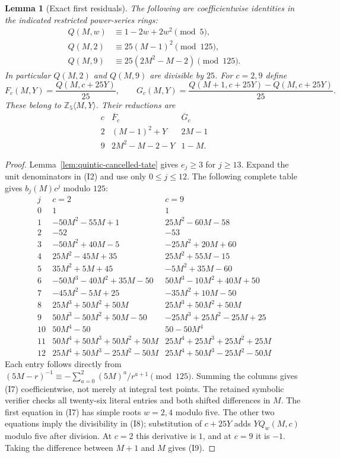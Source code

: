 \documentclass[11pt]{article}
\newtheorem{lemma}{Lemma}
\newcommand{\ZZ}{\mathbb Z}
\begin{document}
\begin{lemma}[Exact first residuals]\label{lem:quintic-index-residuals}
The following are coefficientwise identities in the indicated
restricted power-series rings:
\[
 \begin{split}
 Q(M,w)&\equiv1-2w+2w^2\pmod5,\\
 Q(M,2)&\equiv25(M-1)^2\pmod{125},\\
 Q(M,9)&\equiv25(2M^2-M-2)\pmod{125}.
 \end{split}\tag{I7}
\]
In particular $Q(M,2)$ and $Q(M,9)$ are divisible by $25$.
For $c=2,9$ define
\[
 F_c(M,Y)=\frac{Q(M,c+25Y)}{25},\qquad
 G_c(M,Y)=\frac{Q(M+1,c+25Y)-Q(M,c+25Y)}{25}.                       \tag{I8}
\]
These belong to $\ZZ_5\langle M,Y\rangle$.  Their reductions are
\[
 \begin{array}{c|cc}
 c&\overline F_c&\overline G_c\\\hline
 2&(M-1)^2+Y&2M-1\\
 9&2M^2-M-2-Y&1-M .
 \end{array}                                                      \tag{I9}
\]
\end{lemma}
\begin{proof}
Lemma~\ref{lem:quintic-cancelled-tate} gives $e_j\ge3$ for $j\ge13$.
Expand the unit denominators in (I2) and use only $0\le j\le12$.
The following complete table gives $b_j(M)c^j$ modulo $125$:
\[
\begin{array}{c|l|l}
 j&c=2&c=9\\\hline
0&1&1\\
1&-50M^2-55M+1&25M^2-60M-58\\
2&-52&-53\\
3&-50M^2+40M-5&-25M^2+20M+60\\
4&25M^2-45M+35&25M^2+55M-15\\
5&35M^2+5M+45&-5M^2+35M-60\\
6&-50M^3-40M^2+35M-50&50M^3-10M^2+40M+50\\
7&-45M^2-5M+25&-35M^2+10M-50\\
8&25M^3+50M^2+50M&25M^3+50M^2+50M\\
9&50M^3-50M^2+50M-50&-25M^3+25M^2-25M+25\\
10&50M^4-50&50-50M^4\\
11&50M^4+50M^3+50M^2+50M&25M^4+25M^3+25M^2+25M\\
12&25M^4+50M^3-25M^2-50M&25M^4+50M^3-25M^2-50M
\end{array}
\]
Each entry follows directly from
$(5M-r)^{-1}\equiv-\sum_{a=0}^2(5M)^a/r^{a+1}\pmod{125}$.
Summing the columns gives (I7) coefficientwise, not merely at
integral test points. The retained symbolic verifier checks all
twenty-six literal entries and both shifted differences in $M$.
The first equation in (I7) has simple roots $w=2,4$ modulo five.
The other two equations imply the divisibility in (I8);
substitution of $c+25Y$ adds
$Y Q_w(M,c)$ modulo five after division.
At $c=2$ this derivative is $1$, and at $c=9$ it is $-1$.
Taking the difference between $M+1$ and $M$ gives (I9).
\end{proof}
\end{document}
